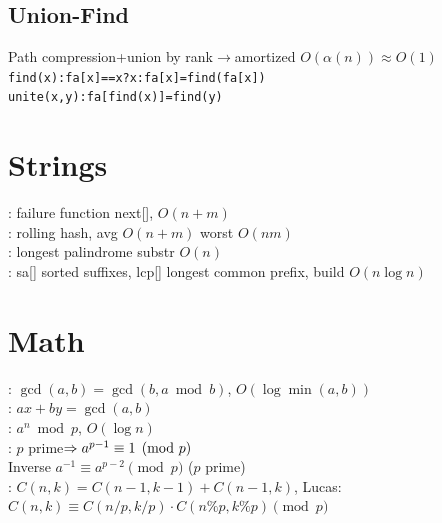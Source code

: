 \documentclass[lang=en,cols=5,paper=a4,fontsize=6pt,scheme=classic]{../cheatsheet}
\begin{document}
\subsection{Union-Find}
Path compression+union by rank$\to$amortized $O(\alpha(n))\approx O(1)$\\
\texttt{find(x):fa[x]==x?x:fa[x]=find(fa[x])}\\
\texttt{unite(x,y):fa[find(x)]=find(y)}

\section{Strings}
: failure function next[], $O(n+m)$\\
: rolling hash, avg $O(n+m)$ worst $O(nm)$\\
: longest palindrome substr $O(n)$\\
: sa[] sorted suffixes, lcp[] longest common prefix, build $O(n\log n)$

\section{Math}
: $\gcd(a,b)=\gcd(b,a\bmod b)$, $O(\log\min(a,b))$\\
: $ax+by=\gcd(a,b)$\\
: $a^n\bmod p$, $O(\log n)$\\
: $p$ prime$\Rightarrow a^{p-1}\equiv1\pmod{p}$\\
Inverse $a^{-1}\equiv a^{p-2}\pmod{p}$ ($p$ prime)\\
: $C(n,k)=C(n-1,k-1)+C(n-1,k)$, Lucas: $C(n,k)\equiv C(n/p,k/p)\cdot C(n\%p,k\%p)\pmod{p}$

\stopcols
\end{document}
